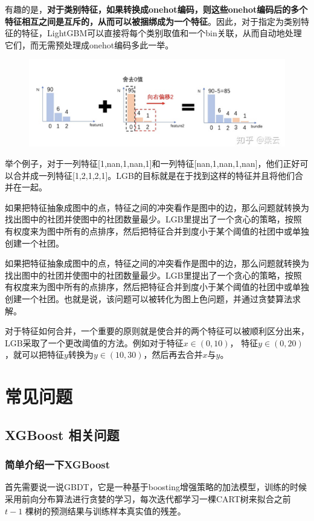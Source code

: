 \documentclass[12pt]{article}
\begin{document}
有趣的是，\textbf{对于类别特征，如果转换成onehot编码，则这些onehot编码后的多个特征相互之间是互斥的，从而可以被捆绑成为一个特征}。因此，对于指定为类别特征的特征，LightGBM可以直接将每个类别取值和一个bin关联，从而自动地处理它们，而无需预处理成onehot编码多此一举。
\begin{figure}[H]
    \centering
    \includegraphics[width=1\textwidth]{fig/LightGBM_EFB_Example.png}
\end{figure}

\begin{framed}
举个例子，对于一列特征[1,nan,1,nan,1]和一列特征[nan,1,nan,1,nan]，他们正好可以合并成一列特征[1,2,1,2,1]。LGB的目标就是在于找到这样的特征并且将他们合并在一起。

如果把特征抽象成图中的点，特征之间的冲突看作是图中的边，那么问题就转换为找出图中的社团并使图中的社团数量最少。LGB里提出了一个贪心的策略，按照有权度来为图中所有的点排序，然后把特征合并到度小于某个阈值的社团中或单独创建一个社团。

如果把特征抽象成图中的点，特征之间的冲突看作是图中的边，那么问题就转换为找出图中的社团并使图中的社团数量最少。LGB里提出了一个贪心的策略，按照有权度来为图中所有的点排序，然后把特征合并到度小于某个阈值的社团中或单独创建一个社团。也就是说，该问题可以被转化为图上色问题，并通过贪婪算法求解。

对于特征如何合并，一个重要的原则就是使合并的两个特征可以被顺利区分出来，LGB采取了一个更改阈值的方法。例如对于特征$x \in (0, 10)$， 特征$y \in (0, 20)$，就可以把特征$y$转换为$y \in (10,30)$，然后再去合并$x$与$y$。
\end{framed}

\section{常见问题\cite{XGBoost_20_Common_Questions}}
\subsection{XGBoost 相关问题}
\subsubsection{简单介绍一下XGBoost}
首先需要说一说GBDT，它是一种基于boosting增强策略的加法模型，训练的时候采用前向分布算法进行贪婪的学习，每次迭代都学习一棵CART树来拟合之前 $t-1$ 棵树的预测结果与训练样本真实值的残差。
\end{document}

